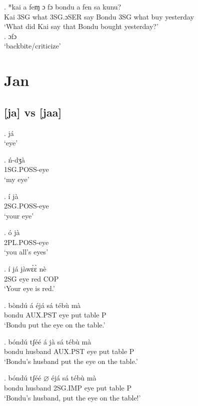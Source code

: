 \documentclass{assets/fieldnotes}
\begin{document}
\exg. *kai a feɱ ɔ fɔ bondu a fen sa kunu?\\
Kai 3SG what 3SG.ɔSER say Bondu 3SG what buy yesterday\\
`What did Kai say that Bondu bought yesterday?' \\ 
 

\exg. ɔfɔ \\
`backbite/criticize' \\ 

\section{Jan}

\subsection{[ja] vs [jaa]}

\ex. já \\
`eye'

\exg. ń-dʒà \\
1SG.POSS-eye \\
`my eye'


\exg. í jà \\
2SG.POSS-eye \\
`your eye'

\exg. ó jà \\
2PL.POSS-eye \\
`you all's eyes'

\exg. í já jàwɛ̀ɛ̀ nè \\
2SG eye red COP \\
`Your eye is red.' 


\exg. bòndú á éjá sá tébù mà  \\
bondu AUX.PST eye put table P \\
`Bondu put the eye on the table.' 

\exg. bóndú tʃéé á jà sá tébù mà \\
bondu husband AUX.PST eye put table P \\
`Bondu's husband put the eye on the table.'

\exg. bóndú tʃéé $\varnothing$ éjá sá tébù mà \\
bondu husband 2SG.IMP eye put table P \\
`Bondu's husband, put the eye on the table!'
\end{document}
